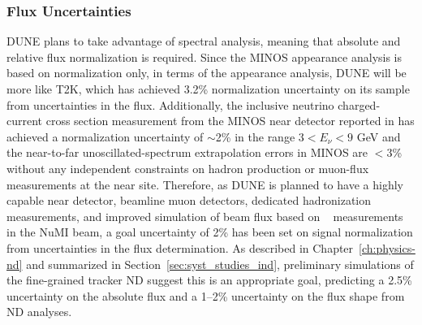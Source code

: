 \subsubsection{Flux Uncertainties}
\label{sec:syst_just_flux}
DUNE plans to take advantage of spectral analysis,
meaning that absolute and relative flux normalization is required. Since the MINOS \nue appearance analysis
is based on normalization only, in terms of the \nue appearance analysis, DUNE will be more like T2K,
which has achieved 3.2\% normalization uncertainty on its \nue sample from uncertainties in the flux.
Additionally, the inclusive neutrino charged-current cross section measurement from the MINOS
near detector reported in \cite{Adamson:2009ju} has achieved a normalization uncertainty of $\sim$2\% in the
range $3 < E_\nu < 9$ GeV and the near-to-far \numu unoscillated-spectrum extrapolation errors in MINOS
are $<$3\% without any independent constraints on hadron production or muon-flux measurements at the near
site. Therefore, as DUNE is planned to have a highly capable near detector, beamline
muon detectors, dedicated hadronization measurements, and improved simulation of beam flux based on
\minerva~\cite{Aliaga:2013uqz} measurements in the NuMI beam, a goal uncertainty of 2\% has been set on \nue signal
normalization from uncertainties in the flux determination.
As described in Chapter~\ref{ch:physics-nd} and summarized in Section~\ref{sec:syst_studies_ind},
preliminary simulations of the fine-grained tracker ND suggest this is an appropriate goal,
predicting a 2.5\% uncertainty on the absolute flux and
a 1--2\% uncertainty on the flux shape from ND analyses.

